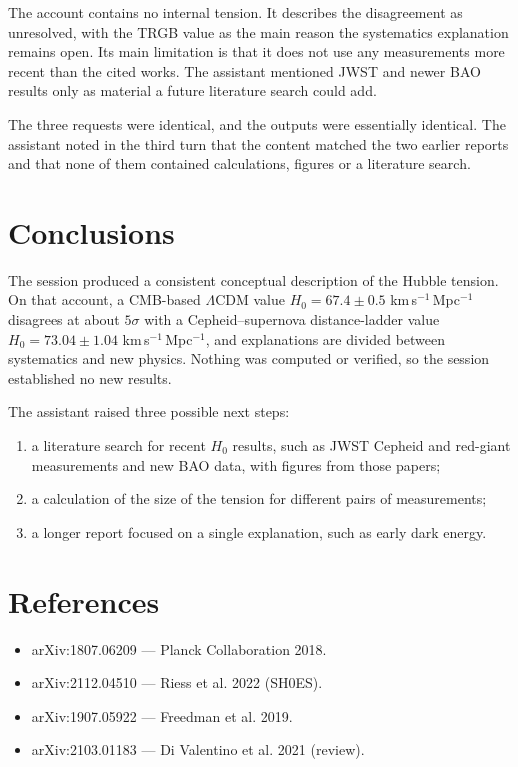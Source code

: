 \documentclass[11pt,a4paper]{article}
\begin{document}
The account contains no internal tension. It describes the disagreement as unresolved, with the TRGB value as the main reason the systematics explanation remains open. Its main limitation is that it does not use any measurements more recent than the cited works. The assistant mentioned JWST and newer BAO results only as material a future literature search could add.

The three requests were identical, and the outputs were essentially identical. The assistant noted in the third turn that the content matched the two earlier reports and that none of them contained calculations, figures or a literature search.

\section{Conclusions}
The session produced a consistent conceptual description of the Hubble tension. On that account, a CMB-based $\Lambda$CDM value $H_0 = 67.4 \pm 0.5$ km\,s$^{-1}$\,Mpc$^{-1}$ disagrees at about $5\sigma$ with a Cepheid--supernova distance-ladder value $H_0 = 73.04 \pm 1.04$ km\,s$^{-1}$\,Mpc$^{-1}$, and explanations are divided between systematics and new physics. Nothing was computed or verified, so the session established no new results.

The assistant raised three possible next steps:
\begin{enumerate}
\item a literature search for recent $H_0$ results, such as JWST Cepheid and red-giant measurements and new BAO data, with figures from those papers;
\item a calculation of the size of the tension for different pairs of measurements;
\item a longer report focused on a single explanation, such as early dark energy.
\end{enumerate}

\section*{References}
\begin{itemize}
\item arXiv:1807.06209 --- Planck Collaboration 2018.
\item arXiv:2112.04510 --- Riess et al. 2022 (SH0ES).
\item arXiv:1907.05922 --- Freedman et al. 2019.
\item arXiv:2103.01183 --- Di Valentino et al. 2021 (review).
\end{itemize}
\end{document}
